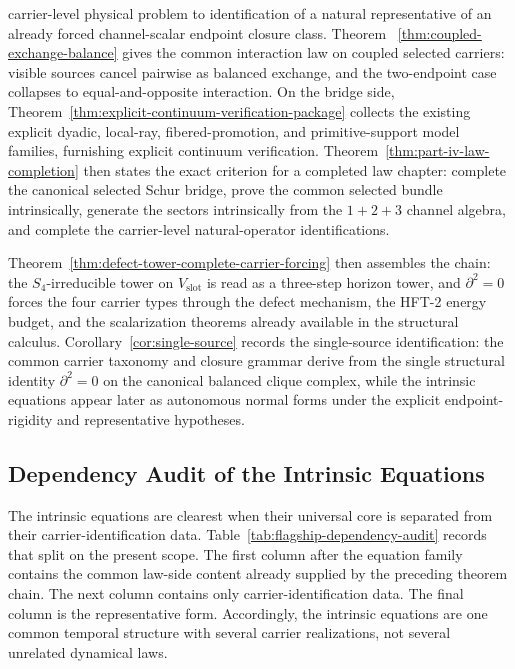 carrier-level physical problem to identification of a natural representative of
an already forced channel-scalar endpoint closure class. Theorem~
\ref{thm:coupled-exchange-balance} gives the common interaction law on coupled
selected carriers: visible sources cancel pairwise as balanced exchange, and
the two-endpoint case collapses to equal-and-opposite interaction. On the
bridge side, Theorem~\ref{thm:explicit-continuum-verification-package}
collects the existing explicit dyadic, local-ray, fibered-promotion, and
primitive-support model families, furnishing explicit continuum verification.
Theorem~\ref{thm:part-iv-law-completion} then states the exact criterion for a
completed law chapter: complete the canonical selected
Schur bridge, prove the common selected bundle intrinsically, generate the
sectors intrinsically from the \(1+2+3\) channel algebra, and complete the
carrier-level natural-operator identifications.

Theorem~\ref{thm:defect-tower-complete-carrier-forcing} then assembles the
chain: the \(S_4\)-irreducible tower on \(V_{\mathrm{slot}}\) is read as a
three-step horizon tower, and \(\partial^2=0\) forces the four carrier types
through the defect mechanism, the HFT-2 energy budget, and the scalarization
theorems already available in the structural calculus.
Corollary~\ref{cor:single-source} records the single-source identification:
the common carrier taxonomy and closure grammar derive from the single
structural identity \(\partial^2=0\) on the canonical balanced clique complex,
while the intrinsic equations appear later as autonomous normal forms under the
explicit endpoint-rigidity and representative hypotheses.

\subsection{Dependency Audit of the Intrinsic Equations}

The intrinsic equations are clearest when their universal core is separated from
their carrier-identification data. Table~\ref{tab:flagship-dependency-audit}
records that split on the present scope. The first column after the equation family
contains the common law-side content already supplied by the preceding theorem
chain. The next column contains only carrier-identification data. The final
column is the representative form. Accordingly, the intrinsic equations
are one common temporal structure with several carrier realizations, not several
unrelated dynamical laws.

